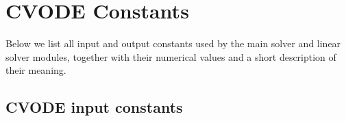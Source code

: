 \chapter{CVODE Constants}\label{c:constants}

Below we list all input and output constants used by the main solver and 
linear solver modules, together with their numerical values and a short
description of their meaning.


\newlength{\tcolone}
\newlength{\tcoltwo}
\settowidth{\tcoltwo}{-20}
\newlength{\tcolthree}
\setlength{\tcolthree}{\textwidth}
\addtolength{\tcolthree}{-0.5in}
\addtolength{\tcolthree}{-\tcolone}
\addtolength{\tcolthree}{-\tcoltwo}

\tablefirsthead{}
\tablehead{}
\tabletail{}
\tablelasttail{}


\section{CVODE input constants}\label{s:cvode_in_constants}

